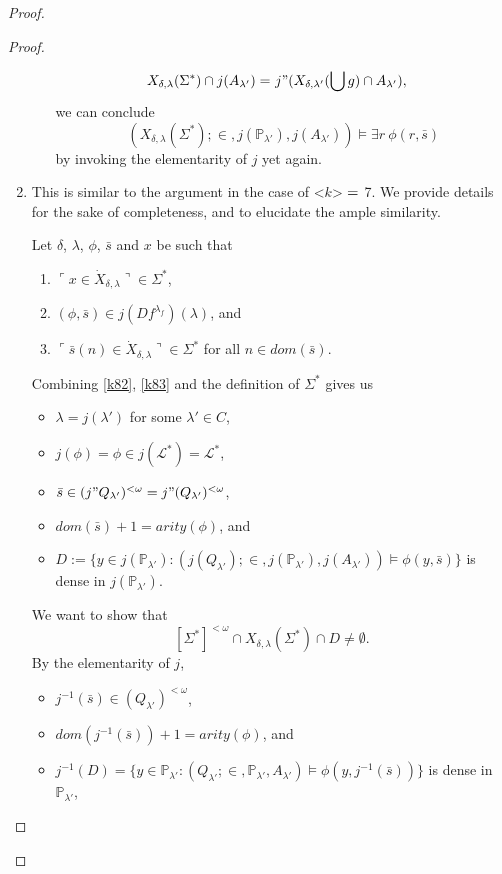 \documentclass[12pt]{article}
\numberwithin{equation}{section}
\begin{document}
\begin{proof}
\begin{proof}
\begin{enumerate}[label=<$k$> $\eq$ \arabic* :, leftmargin=70pt]
\begin{enumerate}[label=Case \arabic*:, leftmargin=50pt]
\begin{align*}
            X_{\delta, \lambda}(\Sigma^*) \cap j(A_{\lambda'}) = \ & j" (X_{\delta, \lambda'}(\bigcup g) \cap A_{\lambda'}),
        \end{align*}
        we can conclude $$(X_{\delta, \lambda}(\Sigma^*); \in, j(\mathbb{P}_{\lambda'}), j(A_{\lambda'})) \models \exists r \ \phi(r, \bar{s})$$ by invoking the elementarity of $j$ yet again.
    \end{enumerate}
    \item This is similar to the argument in the case of <$k$> $\eq$ 7. We provide details for the sake of completeness, and to elucidate the ample similarity. 
    
    Let $\delta$, $\lambda$, $\phi$, $\bar{s}$ and $x$ be such that 
    \begin{enumerate}[label=(K8.\arabic*), leftmargin=50pt]
        \item $\ulcorner x \in \dot{X}_{\delta, \lambda} \urcorner \in \Sigma^*$,
        \item\label{k82} $(\phi, \bar{s}) \in j(Df^{\lambda_f})(\lambda)$, and
        \item\label{k83} $\ulcorner \bar{s}(n) \in \dot{X}_{\delta, \lambda} \urcorner \in \Sigma^*$ for all $n \in dom(\bar{s})$.
    \end{enumerate}
    Combining \ref{k82}, \ref{k83} and the definition of $\Sigma^*$ gives us 
    \begin{itemize}
        \item $\lambda = j(\lambda')$ for some $\lambda' \in C$,
        \item $j(\phi) = \phi \in j(\mathcal{L}^*) = \mathcal{L}^*$,
        \item $\bar{s} \in (j" Q_{\lambda'})^{< \omega} = j" (Q_{\lambda'})^{< \omega}$,
        \item $dom(\bar{s}) + 1 = arity(\phi)$, and
        \item $D := \{y \in j(\mathbb{P}_{\lambda'}) : (j(Q_{\lambda'}); \in, j(\mathbb{P}_{\lambda'}), j(A_{\lambda'})) \models \phi(y, \bar{s})\}$ is dense in $j(\mathbb{P}_{\lambda'})$.
    \end{itemize}
    We want to show that $$[\Sigma^*]^{< \omega} \cap X_{\delta, \lambda}(\Sigma^*) \cap D \neq \emptyset.$$ By the elementarity of $j$, 
    \begin{itemize}
        \item $j^{-1}(\bar{s}) \in (Q_{\lambda'})^{< \omega}$, 
        \item $dom(j^{-1}(\bar{s})) + 1 = arity(\phi)$, and
        \item $j^{-1}(D) = \{y \in \mathbb{P}_{\lambda'} : (Q_{\lambda'}; \in, \mathbb{P}_{\lambda'}, A_{\lambda'}) \models \phi(y, j^{-1}(\bar{s}))\}$ is dense in $\mathbb{P}_{\lambda'}$,

\end{itemize}
\end{enumerate}
\end{proof}
\end{proof}
\end{document}
